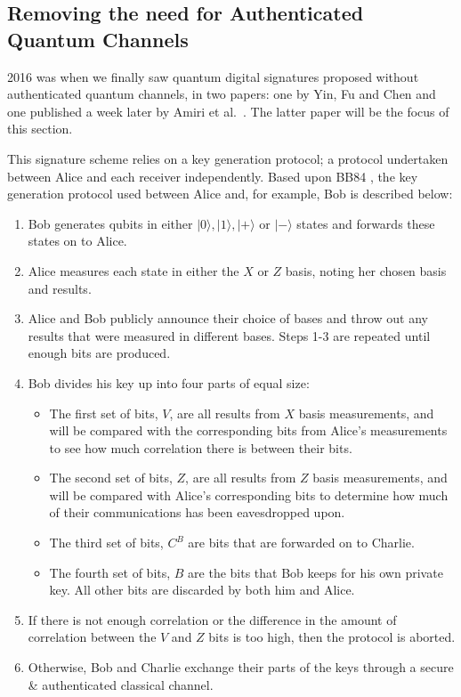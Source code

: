\documentclass[%
 reprint,
 amsmath,amssymb,
 aps,
 pra,
]{revtex4-1}
\begin{document}
\subsection{Removing the need for Authenticated Quantum Channels}
\label{ssec:insecure-qc}

2016 was when we finally saw quantum digital signatures proposed without authenticated quantum channels, in two papers: one by Yin, Fu and Chen \cite{PhysRevA.93.032316} and one published a week later by Amiri et al.\ \cite{PhysRevA.93.032325}. The latter paper will be the focus of this section.

This signature scheme relies on a key generation protocol; a protocol undertaken between Alice and each receiver independently. Based upon BB84 \cite{BB84}, the key generation protocol used between Alice and, for example, Bob is described below:

\begin{enumerate}
\item Bob generates qubits in either $|0\rangle, |1\rangle, |+\rangle \text{ or } |-\rangle$ states and forwards these states on to Alice.
\item Alice measures each state in either the $X$ or $Z$ basis, noting her chosen basis and results.
\item Alice and Bob publicly announce their choice of bases and throw out any results that were measured in different bases. Steps 1-3 are repeated until enough bits are produced.
\item Bob divides his key up into four parts of equal size:
\begin{itemize}
\item The first set of bits, $V$, are all results from $X$ basis measurements, and will be compared with the corresponding bits from Alice's measurements to see how much correlation there is between their bits.
\item The second set of bits, $Z$, are all results from $Z$ basis measurements, and will be compared with Alice's corresponding bits to determine how much of their communications has been eavesdropped upon.
\item The third set of bits, $C^B$ are bits that are forwarded on to Charlie.
\item The fourth set of bits, $B$ are the bits that Bob keeps for his own private key. All other bits are discarded by both him and Alice.
\end{itemize}
\item If there is not enough correlation or the difference in the amount of correlation between the $V$ and $Z$ bits is too high, then the protocol is aborted.
\item Otherwise, Bob and Charlie exchange their parts of the keys through a secure \& authenticated classical channel.
\end{enumerate}
\end{document}
